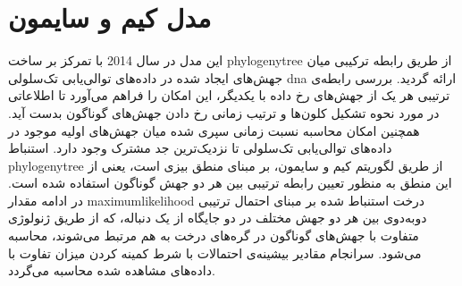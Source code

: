 \section{مدل کیم و سایمون\cite{kim2014using}} 

این مدل در سال 2014 با تمرکز بر ساخت \gls{phylogenytree}  از طریق رابطه ترکیبی میان جهش‌های ایجاد شده در داده‌های توالی‌یابی تک‌سلولی \gls{dna} ارائه گردید. بررسی رابطه‌ی ترتیبی هر یک از جهش‌های رخ داده با یکدیگر، این امکان را فراهم می‌آورد تا اطلاعاتی در مورد نحوه تشکیل کلون‌ها و ترتیب زمانی رخ دادن جهش‌های گوناگون بدست آید. همچنین امکان محاسبه نسبت زمانی سپری شده میان جهش‌های اولیه موجود در داده‌های توالی‌یابی تک‌سلولی تا نزدیک‌ترین جد مشترک وجود دارد. استنباط \gls{phylogenytree} از طریق لگوریتم کیم و سایمون، بر مبنای منطق بیزی است، یعنی از این منطق به منظور تعیین رابطه ترتیبی بین هر دو جهش گوناگون استفاده شده است. در ادامه مقدار \gls{maximumlikelihood} درخت استنباط شده بر مبنای احتمال ترتیبی دوبه‌دوی بین هر دو جهش مختلف در دو جایگاه از یک دنباله، که از طریق ژنولوژی متفاوت با جهش‌های گوناگون در گره‌های درخت به هم مرتبط می‌شوند، محاسبه می‌شود. سرانجام مقادیر بیشینه‌ی  احتمالات با شرط کمینه کردن میزان تفاوت با داده‌های مشاهده شده محاسبه می‌گردد. 

